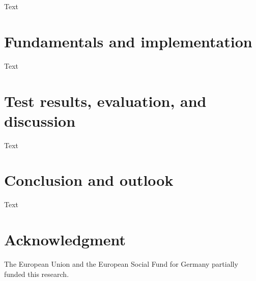 \documentclass[conference]{IEEEtran}
\begin{document}
Text


\section{Fundamentals and implementation}
\label{section:fundamentals}

Text


\section{Test results, evaluation, and discussion}
\label{section:evaluation}

Text


\section{Conclusion and outlook}
\label{section:conclusion}

Text


\section*{Acknowledgment}

The European Union and the European Social Fund for Germany partially funded this research.




\end{document}
